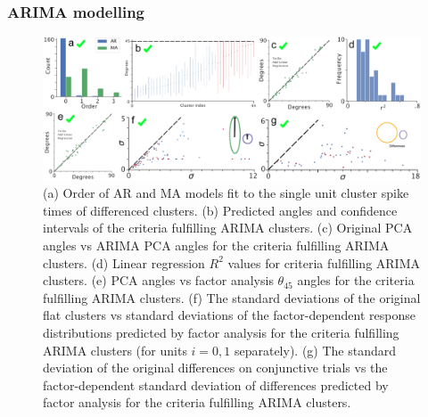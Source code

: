 \documentclass{article}
\begin{document}








\subsubsection*{ARIMA modelling}


\begin{figure}[t!]
\centering
\includegraphics[width=\textwidth]{Figure7.pdf}
\caption{(a) Order of AR and MA models fit to the single unit cluster spike times of differenced clusters. (b) Predicted angles and confidence intervals of the criteria fulfilling ARIMA clusters. (c) Original PCA angles vs ARIMA PCA angles for the criteria fulfilling ARIMA clusters. (d) Linear regression $R^2$ values for criteria fulfilling ARIMA clusters. (e) PCA angles vs factor analysis $\theta_{45}$ angles for the criteria fulfilling ARIMA clusters. (f) The standard deviations of the original flat clusters vs standard deviations of the factor-dependent response distributions predicted by factor analysis for the criteria fulfilling ARIMA clusters (for units $i = 0,1$ separately). (g) The standard deviation of the original differences on conjunctive trials vs the factor-dependent standard deviation of differences predicted by factor analysis for the criteria fulfilling ARIMA clusters.}
\label{fig:universe}
\end{figure}
\end{document}
